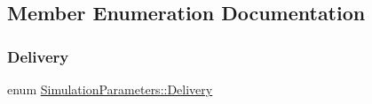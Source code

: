 \subsection{Member Enumeration Documentation}
\mbox{\label{class_simulation_parameters_ae08444273809241f502aa422205f7307}} 
\subsubsection{\texorpdfstring{Delivery}{Delivery}}
{\footnotesize\ttfamily enum \hyperlink{class_simulation_parameters_ae08444273809241f502aa422205f7307}{Simulation\+Parameters\+::\+Delivery}\hspace{0.3cm}{\ttfamily [strong]}}

